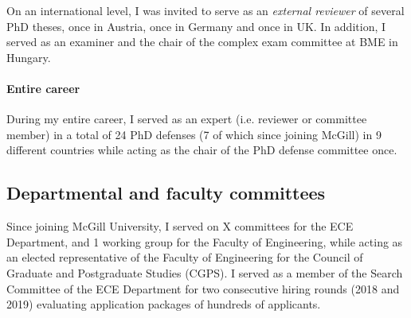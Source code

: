 On an international level, I was invited to serve as an \emph{external reviewer} of several PhD theses, once in Austria, once in Germany and once in UK. In addition, I served as an examiner and the chair of the complex exam committee at BME in Hungary. 

\paragraph{Entire career}
During my entire career, I served as an expert (i.e. reviewer or committee member) in a total of 24 PhD defenses (7 of which since joining McGill) in 9 different countries while acting as the chair of the PhD defense committee once. 

\subsection{Departmental and faculty committees}
Since joining McGill University, I served on X committees for the ECE Department, and 1 working group for the Faculty of Engineering, while acting as an elected representative of the Faculty of Engineering for the Council of Graduate and Postgraduate Studies (CGPS). I served as a member of the Search Committee of the ECE Department for two consecutive hiring rounds (2018 and 2019) evaluating application packages of hundreds of applicants. 


